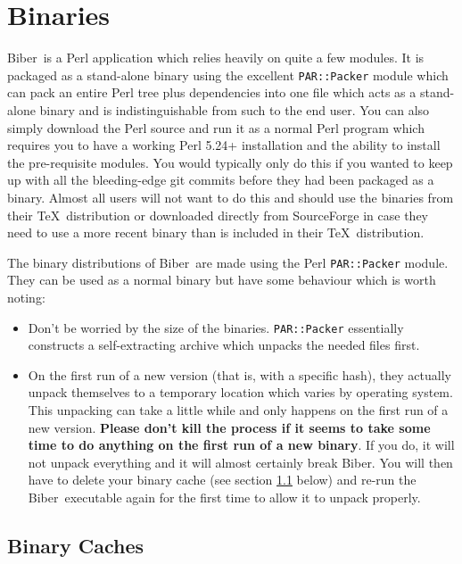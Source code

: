 \documentclass{ltxdockit}
\newcommand*{\biber}{Biber\xspace}
\begin{document}
\section{Binaries}\label{binaries}

\biber\ is a Perl application which relies heavily on quite a few
modules. It is packaged as a stand-alone binary using the excellent
\verb+PAR::Packer+ module which can pack an entire Perl tree plus
dependencies into one file which acts as a stand-alone binary and is
indistinguishable from such to the end user. You can also simply download
the Perl source and run it as a normal Perl program which
requires you to have a working Perl 5.24+ installation and the
ability to install the pre-requisite modules. You would typically only do
this if you wanted to keep up with all the bleeding-edge git commits before
they had been packaged as a binary. Almost all users will not want to do
this and should use the binaries from their \TeX\ distribution or downloaded
directly from SourceForge in case they need to use a more recent binary
than is included in their \TeX\ distribution.

The binary distributions of \biber\ are made using the Perl \verb+PAR::Packer+
module. They can be used as a normal binary but have some behaviour which
is worth noting:

\begin{itemize}
\item Don't be worried by the size of the binaries. \verb+PAR::Packer+ essentially
  constructs a self-extracting archive which unpacks the needed files first.
\item On the first run of a new version (that is, with a specific hash),
  they actually unpack themselves to a temporary location which varies by
  operating system. This unpacking can take a little while and only happens
  on the first run of a new version. \textbf{Please don't kill the process
    if it seems to take some time to do anything on the first run of a new
    binary}. If you do, it will not unpack everything and it will almost
  certainly break \biber. You will then have to delete your binary
  cache (see section \ref{bc} below) and re-run the \biber\ executable
  again for the first time to allow it to unpack properly.
\end{itemize}

\subsection{Binary Caches}\label{bc}
\end{document}
